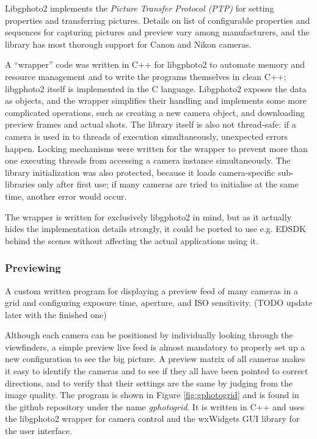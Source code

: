 Libgphoto2 implements the \emph{Picture Transfer Protocol (PTP)} \cite{ptpTODO} for setting properties and transferring pictures.
Details on list of configurable properties and sequences for capturing pictures and preview vary among manufacturers, and the library has most thorough support for Canon and Nikon cameras.

A ``wrapper'' code was written in C++ for libgphoto2 to automate memory and resource management and to write the programs themselves in clean C++; libgphoto2 itself is implemented in the C language.
Libgphoto2 exposes the data as objects, and the wrapper simplifies their handling and implements some more complicated operations, such as creating a new camera object, and downloading preview frames and actual shots.
The library itself is also not thread-safe: if a camera is used in to threads of execution simultaneously, unexpected errors happen.
Locking mechanisms were written for the wrapper to prevent more than one executing threads from accessing a camera instance simultaneously.
The library initialization was also protected, because it loads camera-specific sub-libraries only after first use; if many cameras are tried to initialise at the same time, another error would occur.

The wrapper is written for exclusively libgphoto2 in mind, but as it actually hides the implementation details strongly, it could be ported to use e.g. EDSDK behind the scenes without affecting the actual applications using it.


\subsubsection{Previewing} %

{A custom written program for displaying a preview feed of many cameras in a grid and configuring exposure time, aperture, and ISO sensitivity. (TODO update later with the finished one)}


Although each camera can be positioned by individually looking through the viewfinders, a simple preview live feed is almost mandatory to properly set up a new configuration to see the big picture.
A preview matrix of all cameras makes it easy to identify the cameras and to see if they all have been pointed to correct directions, and to verify that their settings are the same by judging from the image quality.
The program is shown in Figure \ref{fig:gphotogrid} and is found in the github repository under the name \emph{gphotogrid}.
It is written in C++ and uses the libgphoto2 wrapper for camera control and the wxWidgets GUI library for the user interface.

